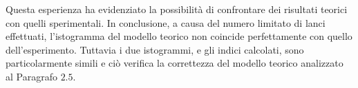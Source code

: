 Questa esperienza ha evidenziato la possibilità di confrontare dei risultati teorici con quelli sperimentali. In conclusione, a causa del numero limitato di lanci effettuati, l'istogramma del modello teorico non coincide perfettamente con quello dell'esperimento. Tuttavia i due istogrammi, e gli indici calcolati, sono particolarmente simili e ciò verifica la correttezza del modello teorico analizzato al Paragrafo $2.5$.